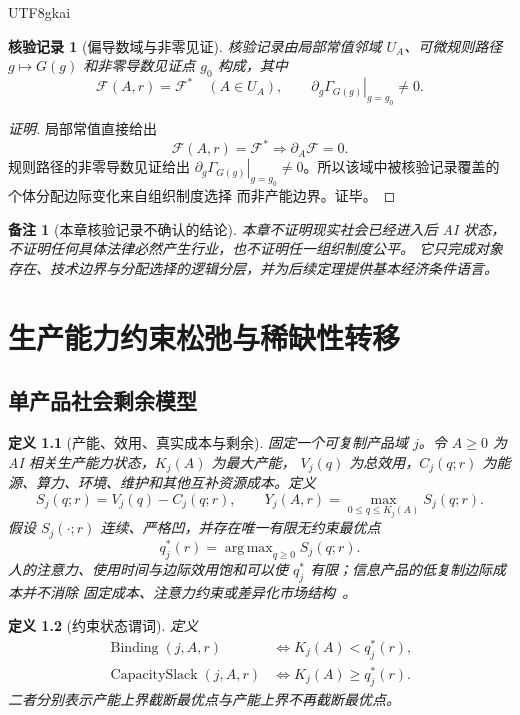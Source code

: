 \documentclass[12pt,a4paper,openany]{report}
\newtheorem{definition}{定义}[chapter]
\newtheorem{remark}{备注}[chapter]
\newtheorem{Certificate}{核验记录}[chapter]
\newcommand{\Feas}{\mathcal F}
\DeclareMathOperator*{\argmax}{arg\,max}
\DeclareMathOperator{\CapacitySlack}{CapacitySlack}
\DeclareMathOperator{\Binding}{Binding}
\begin{document}
\begin{CJK*}{UTF8}{gkai}
\begin{Certificate}[偏导数域与非零见证]
核验记录由局部常值邻域 \(U_A\)、可微规则路径 \(g\mapsto G(g)\) 和非零导数见证点
\(g_0\) 构成，其中
\[
  \Feas(A,r)=\Feas^*\quad(A\in U_A),\qquad
  \left.\partial_g\Gamma_{G(g)}\right|_{g=g_0}\ne0.
\]
\end{Certificate}

\begin{proof}[证明]
局部常值直接给出
\[
  \Feas(A,r)=\Feas^*\Longrightarrow\partial_A\Feas=0.
\]
规则路径的非零导数见证给出
\(\left.\partial_g\Gamma_{G(g)}\right|_{g=g_0}\ne0\)。所以该域中被核验记录覆盖的个体分配边际变化来自组织制度选择
而非产能边界。证毕。
\end{proof}

\begin{remark}[本章核验记录不确认的结论]
本章不证明现实社会已经进入后 AI 状态，不证明任何具体法律必然产生行业，也不证明任一组织制度公平。
它只完成对象存在、技术边界与分配选择的逻辑分层，并为后续定理提供基本经济条件语言。
\end{remark}
\clearpage
\chapter{生产能力约束松弛与稀缺性转移}
\label{chap:capacity-transfer}

\section{单产品社会剩余模型}

\begin{definition}[产能、效用、真实成本与剩余]
固定一个可复制产品域 \(j\)。令 \(A\ge0\) 为 AI 相关生产能力状态，\(K_j(A)\) 为最大产能，
\(V_j(q)\) 为总效用，\(C_j(q;r)\) 为能源、算力、环境、维护和其他互补资源成本。定义
\[
  S_j(q;r)=V_j(q)-C_j(q;r),
\qquad
  Y_j(A,r)=\max_{0\le q\le K_j(A)}S_j(q;r).
\]
假设 \(S_j(\cdot;r)\) 连续、严格凹，并存在唯一有限无约束最优点
\[
  q_j^*(r)=\argmax_{q\ge0}S_j(q;r).
\]
人的注意力、使用时间与边际效用饱和可以使 \(q_j^*\) 有限；信息产品的低复制边际成本并不消除
固定成本、注意力约束或差异化市场结构~\cite{Varian1998InformationGoods}。
\end{definition}

\begin{definition}[约束状态谓词]
定义
\[
\begin{aligned}
  \Binding(j,A,r)
  &\Longleftrightarrow K_j(A)<q_j^*(r),\\
  \CapacitySlack(j,A,r)
  &\Longleftrightarrow K_j(A)\ge q_j^*(r).
\end{aligned}
\]
二者分别表示产能上界截断最优点与产能上界不再截断最优点。
\end{definition}


\end{CJK*}
\end{document}
